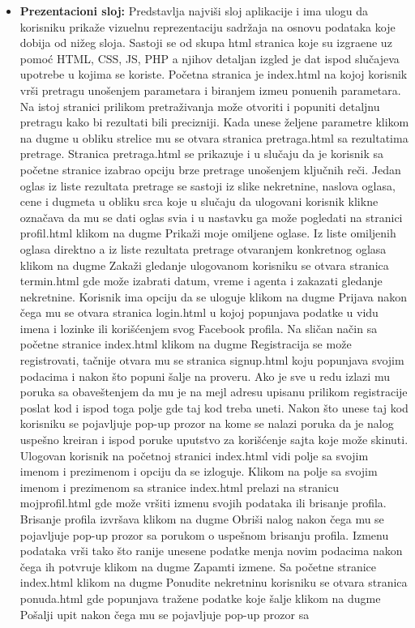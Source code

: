 \documentclass[20pt]{article}
\begin{document}
\begin{itemize}
    \item \textbf{Prezentacioni sloj:} Predstavlja najvi\v {s}i sloj aplikacije i ima ulogu da korisniku prika\v {z}e vizuelnu reprezentaciju sadr\v {z}aja na osnovu podataka koje dobija od ni\v {z}eg sloja. Sastoji se od skupa html stranica koje su izgra\dj ene uz pomo\' c HTML, CSS, JS, PHP a njihov detaljan izgled je dat ispod slu\v {c}ajeva upotrebe u kojima se koriste. Po\v {c}etna stranica je index.html na kojoj korisnik vr\v {s}i pretragu uno\v {s}enjem parametara i biranjem izme\dj u ponu\dj enih parametara. Na istoj stranici prilikom pretra\v {z}ivanja mo\v {z}e otvoriti i popuniti detaljnu pretragu kako bi rezultati bili precizniji. Kada unese \v {z}eljene parametre klikom na dugme u obliku strelice mu se otvara stranica pretraga.html sa rezultatima pretrage. Stranica pretraga.html se prikazuje i u slu\v {c}aju da je korisnik sa po\v {c}etne stranice izabrao opciju brze pretrage uno\v {s}enjem klju\v {c}nih re\v {c}i. Jedan oglas iz liste rezultata pretrage se sastoji iz slike nekretnine, naslova oglasa, cene i dugmeta u obliku srca koje u slu\v {c}aju da ulogovani korisnik klikne ozna\v {c}ava da mu se dati oglas svi\dj a i u nastavku ga mo\v {z}e pogledati na stranici profil.html klikom na dugme Prika\v {z}i moje omiljene oglase. Iz liste omiljenih oglasa direktno a iz liste rezultata pretrage otvaranjem konkretnog oglasa klikom na dugme Zaka\v {z}i gledanje ulogovanom korisniku se otvara stranica termin.html gde mo\v {z}e izabrati datum, vreme i agenta i zakazati gledanje nekretnine. Korisnik ima opciju da se uloguje klikom na dugme Prijava nakon \v {c}ega mu se otvara stranica login.html u kojoj popunjava podatke u vidu imena i lozinke ili kori\v {s}\' {c}enjem svog Facebook profila. Na sli\v {c}an na\v {c}in sa po\v {c}etne stranice index.html klikom na dugme Registracija se mo\v {z}e registrovati, ta\v {c}nije otvara mu se stranica signup.html koju popunjava svojim podacima i nakon \v {s}to popuni \v {s}alje na proveru. Ako je sve u redu izlazi mu poruka sa obave\v {s}tenjem da mu je na mejl adresu upisanu prilikom registracije poslat kod i ispod toga polje gde taj kod treba uneti. Nakon \v {s}to unese taj kod korisniku se pojavljuje pop-up prozor na kome se nalazi poruka da je nalog uspe\v {s}no kreiran i ispod poruke uputstvo za kori\v {s}\' {c}enje sajta koje mo\v {z}e skinuti. Ulogovan korisnik na po\v {c}etnoj stranici index.html vidi polje sa svojim imenom i prezimenom i opciju da se izloguje. Klikom na polje sa svojim imenom i prezimenom sa stranice index.html prelazi na stranicu mojprofil.html gde mo\v {z}e vr\v {s}iti izmenu svojih podataka ili brisanje profila. Brisanje profila izvr\v {s}ava klikom na dugme Obri\v {s}i nalog nakon \v {c}ega mu se pojavljuje pop-up prozor sa porukom o uspe\v {s}nom brisanju profila. Izmenu podataka vr\v {s}i tako \v {s}to ranije unesene podatke menja novim podacima nakon \v {c}ega ih potvr\dj uje klikom na dugme Zapamti izmene. Sa po\v {c}etne stranice index.html klikom na dugme Ponudite nekretninu korisniku se otvara stranica ponuda.html gde popunjava tra\v {z}ene podatke koje \v {s}alje klikom na dugme Po\v {s}alji upit nakon \v {c}ega mu se pojavljuje pop-up prozor sa 
\end{itemize}
\end{document}

